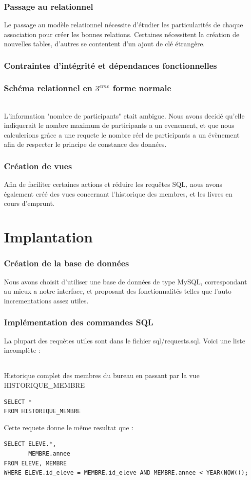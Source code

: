 \documentclass[a4paper, 11pt]{article}
\begin{document}
\section{Passage au relationnel}
Le passage au modèle relationnel nécessite d'étudier les particularités de chaque association pour créer les bonnes relations. Certaines nécessitent la création de nouvelles tables, d'autres se contentent d'un ajout de clé étrangère.
\section{Contraintes d'intégrité et dépendances fonctionnelles}
\section{Schéma relationnel en $3^{eme}$ forme normale}
\\L'information "nombre de participants" etait ambigue. Nous avons decidé qu'elle indiquerait le nombre maximum de participants a un evenement, et que nous calculerions grâce a une requete le nombre réel de participants a un évènement afin de respecter le principe de constance des données.
\section{Création de vues}
Afin de faciliter certaines actions et réduire les requêtes SQL, nous avons également créé des vues concernant l'historique des membres, et les livres en cours d'emprunt.

\newpage
\part{Implantation}
\setcounter{section}{0}
\section{Création de la base de données}
Nous avons choisit d'utiliser une base de données de type MySQL, correspondant au mieux a notre interface, et proposant des fonctionnalités telles que l'auto incrementations assez utiles.

\section{Implémentation des commandes SQL}
La plupart des requètes utiles sont dans le fichier sql/requests.sql. Voici une liste incomplète :
\paragraph{}
Historique complet des membres du bureau en passant par la vue HISTORIQUE_MEMBRE
\begin{verbatim}
SELECT *
FROM HISTORIQUE_MEMBRE
\end{verbatim}
Cette requete donne le même resultat que :
\begin{verbatim}
SELECT ELEVE.*,
       MEMBRE.annee
FROM ELEVE, MEMBRE 
WHERE ELEVE.id_eleve = MEMBRE.id_eleve AND MEMBRE.annee < YEAR(NOW());
\end{verbatim}
\end{document}
